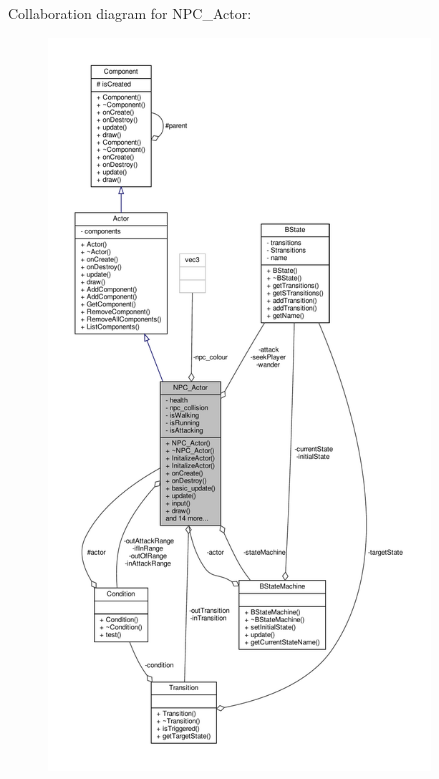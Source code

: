 Collaboration diagram for N\+P\+C\+\_\+\+Actor\+:
\nopagebreak
\begin{figure}[H]
\begin{center}
\leavevmode
\includegraphics[height=550pt]{classNPC__Actor__coll__graph}
\end{center}
\end{figure}
